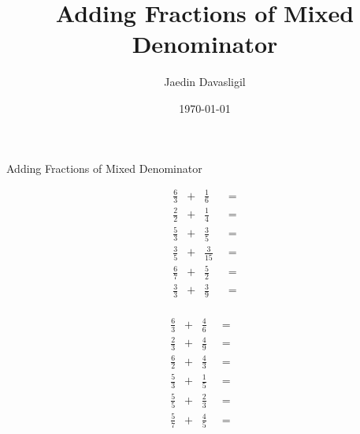 \documentclass{article}
\title{Adding Fractions of Mixed Denominator}
\author{Jaedin Davasligil}
\date{\today}
\begin{document}
\thispagestyle{empty}
\begin{center}
\huge Adding Fractions of Mixed Denominator
\end{center}
\begin{multicols}{2}
	\vspace*{.5in} \huge
	\begin{align*}
		\frac{6}{3} \;\; + \;\; \frac{1}{6} \;\; &= \\[.75in]
		\frac{2}{2} \;\; + \;\; \frac{1}{4} \;\; &= \\[.75in]
		\frac{5}{3} \;\; + \;\; \frac{3}{5} \;\; &= \\[.75in]
		\frac{3}{5} \;\; + \;\; \frac{3}{15} \;\; &= \\[.75in]
		\frac{6}{7} \;\; + \;\; \frac{5}{2} \;\; &= \\[.75in]
		\frac{3}{3} \;\; + \;\; \frac{3}{9} \;\; &= \\[.75in]
	\end{align*}

	\columnbreak

	\vspace*{.5in}
	\begin{align*}
		\frac{6}{3} \;\; + \;\; \frac{4}{6} \;\; &= &\\[.75in]
		\frac{2}{3} \;\; + \;\; \frac{4}{9} \;\; &= &\\[.75in]
		\frac{6}{2} \;\; + \;\; \frac{4}{3} \;\; &= &\\[.75in]
		\frac{5}{3} \;\; + \;\; \frac{1}{5} \;\; &= &\\[.75in]
		\frac{5}{5} \;\; + \;\; \frac{2}{3} \;\; &= &\\[.75in]
		\frac{5}{7} \;\; + \;\; \frac{4}{5} \;\; &= &\\[.75in]
	\end{align*}
\end{multicols}
\end{document}
